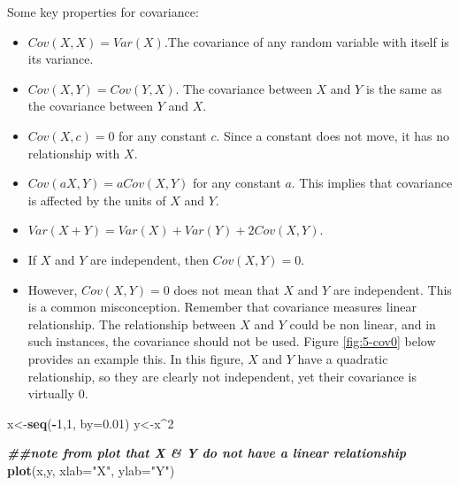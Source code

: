 \documentclass[
]{book}
\newenvironment{Shaded}{\begin{snugshade}}{\end{snugshade}}
\newcommand{\AttributeTok}[1]{\textcolor[rgb]{0.13,0.29,0.53}{#1}}
\newcommand{\DecValTok}[1]{\textcolor[rgb]{0.00,0.00,0.81}{#1}}
\newcommand{\DocumentationTok}[1]{\textcolor[rgb]{0.56,0.35,0.01}{\textbf{\textit{#1}}}}
\newcommand{\FloatTok}[1]{\textcolor[rgb]{0.00,0.00,0.81}{#1}}
\newcommand{\FunctionTok}[1]{\textcolor[rgb]{0.13,0.29,0.53}{\textbf{#1}}}
\newcommand{\NormalTok}[1]{#1}
\newcommand{\OtherTok}[1]{\textcolor[rgb]{0.56,0.35,0.01}{#1}}
\newcommand{\SpecialCharTok}[1]{\textcolor[rgb]{0.81,0.36,0.00}{\textbf{#1}}}
\newcommand{\StringTok}[1]{\textcolor[rgb]{0.31,0.60,0.02}{#1}}
\providecommand{\tightlist}{%
  \setlength{\itemsep}{0pt}\setlength{\parskip}{0pt}}
\begin{document}
Some key properties for covariance:

\begin{itemize}
\tightlist
\item
  \(Cov(X,X) = Var(X)\).The covariance of any random variable with itself is its variance.
\item
  \(Cov(X,Y) = Cov(Y,X)\). The covariance between \(X\) and \(Y\) is the same as the covariance between \(Y\) and \(X\).
\item
  \(Cov(X,c) = 0\) for any constant \(c\). Since a constant does not move, it has no relationship with \(X\).
\item
  \(Cov(aX,Y) = a Cov(X,Y)\) for any constant \(a\). This implies that covariance is affected by the units of \(X\) and \(Y\).
\item
  \(Var(X + Y) = Var(X) + Var(Y) + 2 Cov(X,Y)\).
\item
  If \(X\) and \(Y\) are independent, then \(Cov(X,Y) = 0\).
\item
  However, \(Cov(X,Y) = 0\) does not mean that \(X\) and \(Y\) are independent. This is a common misconception. Remember that covariance measures linear relationship. The relationship between \(X\) and \(Y\) could be non linear, and in such instances, the covariance should not be used. Figure \ref{fig:5-cov0} below provides an example this. In this figure, \(X\) and \(Y\) have a quadratic relationship, so they are clearly not independent, yet their covariance is virtually 0.
\end{itemize}

\begin{Shaded}
\begin{Highlighting}[]
\NormalTok{x}\OtherTok{\textless{}{-}}\FunctionTok{seq}\NormalTok{(}\SpecialCharTok{{-}}\DecValTok{1}\NormalTok{,}\DecValTok{1}\NormalTok{, }\AttributeTok{by=}\FloatTok{0.01}\NormalTok{)}
\NormalTok{y}\OtherTok{\textless{}{-}}\NormalTok{x}\SpecialCharTok{\^{}}\DecValTok{2}

\DocumentationTok{\#\#note from plot that X \& Y do not have a linear relationship}
\FunctionTok{plot}\NormalTok{(x,y, }\AttributeTok{xlab=}\StringTok{"X"}\NormalTok{, }\AttributeTok{ylab=}\StringTok{"Y"}\NormalTok{)}
\end{Highlighting}
\end{Shaded}
\end{document}
